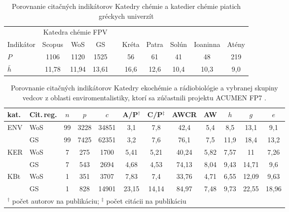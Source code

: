 {\begin{table}
\centering\small
  \label{tab:lazaridis.results}
  \caption[Porovnanie Katedry chémie a chemických katedier vybraných gréckych univerzít]
  {Porovnanie citačných indikátorov Katedry chémie a katedier chémie piatich gréckych univerzít \citep{Lazaridis2010}}
\begin{tabularx}{\textwidth}{Xccclccccc}
\toprule\noalign{\vspace{.5ex}}
           & \multicolumn{3}{c}{Katedra chémie FPV}& \phantom{M} & \multicolumn{5}{c}{\citet{Kazakis2015}} \\
Indikátor  & Scopus & WoS   & GS                 &  & Kréta & Patra & Solún & Ioaninna & Atény \\[0.3ex]
\midrule\noalign{\vspace{.5ex}}
 $P$         & 1106   & 1120  & 1525               & & 56    & 61    & 41    & 48       & 219   \\
 $\bar{h}$  & 11,78  & 11,94 & 13,61              & & 16,6  & 12,6  & 10,4  & 10,3     & 9,0   \\[0.5ex]
  \bottomrule
\end{tabularx}
\end{table}

\begin{table}
\centering\small
\label{tab:wildgaard.results}
  \caption[Porovnanie KEB a vybranej skupiny enviromentalistov]
  {Porovnanie citačných indikátorov Katedry ekochémie a rádiobiológie a vybranej skupiny vedcov z oblasti enviromentalistiky, ktorí sa zúčastnili
  projektu ACUMEN FP7 \citep{Wildgaard2015}.}
\begin{tabularx}{\textwidth}{Xlcccccccccc}
  \toprule\noalign{\vspace{.3ex}}
 kat. &Cit.\,reg.   & $n$  & $p$    & $c$     & A/P$^\dagger$  & C/P$^\ddagger$ & AWCR & AW  & $h$    & $g$    & $e$    \\[0.3ex]
\midrule\noalign{\vspace{.5ex}}
 ENV  & WoS      & 99 & 3228 & 34851 & 3,1   & 7,8   & 42,4  & 5,4  & 8,5  & 13,1  & 9,1   \\
      & GS       & 99 & 7425 & 62351 & 3,2   & 7,6   & 76,1  & 7,5  & 11,9 & 18,4  & 13,2  \\[2ex]
 KER  & WoS      & 7  & 275  & 1700  & 5,41  & 5,21  & 40,24 & 5,82 & 7,57 & 11    & 7,26  \\
      & GS       & 7  & 543  & 2694  & 4,68  & 4,53  & 74,13 & 8,04 & 9,43 & 14,71 & 9,6   \\[2ex]
 KBt  & WoS      & 1  & 351  & 3707  & 7,83  & 7,4   & 33,76 & 4,71 & 6,55 & 12,09 & 9,63  \\
      & GS       & 1  & 828  & 14901 & 23,15 & 14,14 & 84,97 & 7,48 & 9,73 & 22,55 & 18,96 \\[0.5ex]
\bottomrule
    \multicolumn{12}{l}{\footnotesize $^\dagger$ počet autorov na publikáciu; $^\ddagger$ počet citácii na publikáciu} \\
\end{tabularx}
\end{table}

}
